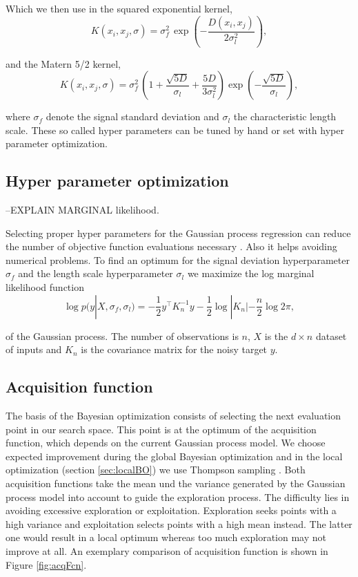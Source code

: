 Which we then use in the squared exponential kernel,
$$K(x_i,x_j,\sigma) = \sigma_{f}^{2}\,\exp\left(-\frac{D(x_i,x_j)}{2\sigma_l^2} \right), $$

and the Matern 5/2 kernel,
$$K(x_i,x_j,\sigma) = \sigma_{f}^{2}\,\left(1 + \frac{\sqrt{5 D}}{\sigma_l} + \frac{5 D}{3\sigma_l^2} \right) \exp\left(-\frac{\sqrt{5 D}}{\sigma_l} \right),$$

where $\sigma_f$ denote the signal standard deviation and $\sigma_l$ the characteristic length scale. These so called hyper parameters can be tuned by hand or set with hyper parameter optimization.

\subsection{Hyper parameter optimization}

--EXPLAIN MARGINAL likelihood.

Selecting proper hyper parameters for the Gaussian process regression can reduce the number of objective function evaluations necessary \cite{lizotte2008practical}. Also it helps avoiding numerical problems. To find an optimum for the signal deviation hyperparameter $\sigma_f$ and the length scale hyperparameter $\sigma_l$ we maximize the log marginal likelihood function
\begin{equation} \label{eq:hypOpt}
    \log p(y|X,\sigma_f,\sigma_l) = -\frac{1}{2} y^\top K_n^{-1} y -\frac{1}{2} \log |K_n| -\frac{n}{2}\log 2\pi,
\end{equation}

of the Gaussian process. The number of observations is $n$, $X$ is the $d \times n$ dataset of inputs and $K_n$ is the covariance matrix for the noisy target $y$.

\subsection{Acquisition function}
The basis of the Bayesian optimization consists of selecting the next evaluation point in our search space. This point is at the optimum of the acquisition function, which depends on the current Gaussian process model. We choose expected improvement \cite{brochu2010tutorial} during the global Bayesian optimization and in the local optimization (section \ref{sec:localBO}) we use Thompson sampling \cite{akrour2017local}. Both acquisition functions take the mean und the variance generated by the Gaussian process model into account to guide the exploration process. The difficulty lies in avoiding excessive exploration or exploitation. Exploration seeks points with a high variance and exploitation selects points with a high mean instead. The latter one would result in a local optimum whereas too much exploration may not improve at all. An exemplary comparison of acquisition function is shown in Figure \ref{fig:acqFcn}.

